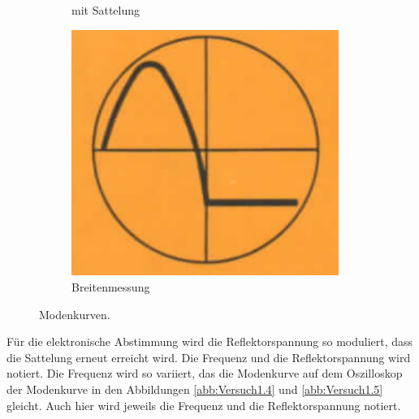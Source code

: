 \begin{figure}
\begin{subfigure}{0.2\textwidth}
    \caption{mit Sattelung}
    \label{abb:Versuch1.2}
  \end{subfigure}
  \begin{subfigure}{0.2\textwidth}
    \raggedright
    \includegraphics[width=0.955\textwidth]{Versuch1.3.png}
    \caption{Breitenmessung}
    \label{abb:Versuch1.3}
  \end{subfigure}
  \caption{Modenkurven.\cite{Q1}}
\end{figure}
\FloatBarrier

Für die elektronische Abstimmung wird die Reflektorspannung so moduliert, dass
die Sattelung erneut erreicht wird. Die Frequenz und die Reflektorspannung wird
notiert. Die Frequenz wird so variiert, das die Modenkurve auf dem Oszilloskop
der Modenkurve in den Abbildungen \ref{abb:Versuch1.4} und \ref{abb:Versuch1.5}
gleicht. Auch hier wird jeweils die Frequenz und die Reflektorspannung notiert.

